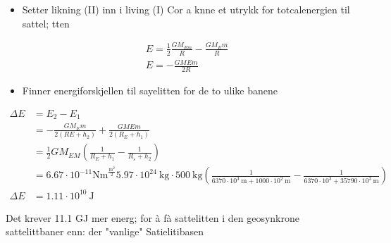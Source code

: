 \documentclass[10pt]{article}
\begin{document}
\begin{itemize}
  \item Setter likning (II) inn i living (I) Cor a knne et utrykk for totcalenergien til sattel; tten
\end{itemize}

$$
\begin{aligned}
& E=\frac{1}{2} \frac{G M_{E m}}{R}-\frac{G M_{E} m}{R} \\
& E=-\frac{G M E m}{2 R}
\end{aligned}
$$

\begin{itemize}
  \item Finner energiforskjellen til sayelitten for de to ulike banene
\end{itemize}

$$
\begin{aligned}
\Delta E & =E_{2}-E_{1} \\
& =-\frac{G M_{E} m}{2\left(R E+h_{2}\right)}+\frac{G M E m}{2\left(R_{E}+h_{1}\right)} \\
& =\frac{1}{2} G M_{E M}\left(\frac{1}{R_{E}+h_{1}}-\frac{1}{R_{\varepsilon}+h_{2}}\right) \\
& =6.67 \cdot 10^{-11} \mathrm{Nm}^{\frac{\mathrm{m}^{2}}{2}} 5.97 \cdot 10^{24} \mathrm{~kg} \cdot 500 \mathrm{~kg}\left(\frac{1}{6370 \cdot 10^{3} \mathrm{~m}+1000 \cdot 10^{2} \mathrm{~m}}-\frac{1}{6370 \cdot 10^{3}+35790 \cdot 10^{3} \mathrm{~m}}\right) \\
\Delta E & =1.11 \cdot 10^{10} \mathrm{~J}
\end{aligned}
$$

Det krever 11.1 GJ mer energ; for à fà sattelitten i den geosynkrone sattelittbaner enn: der "vanlige" Satielitibasen
\end{document}
